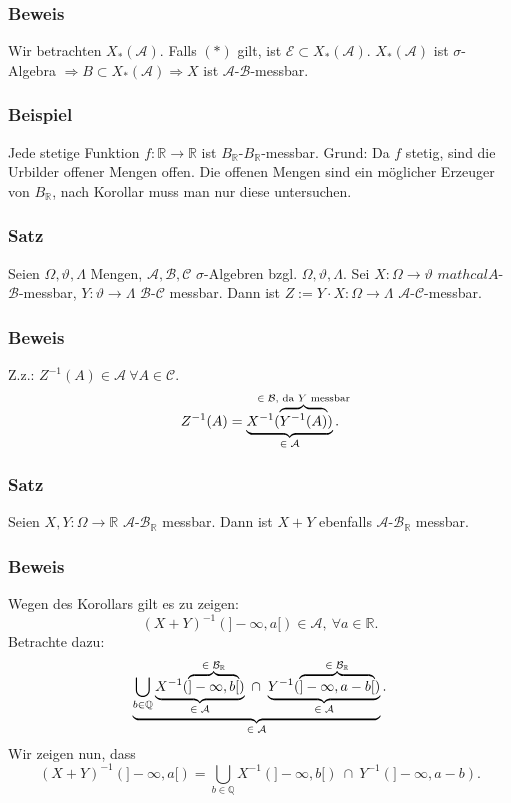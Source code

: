 \subsubsection{Beweis}
Wir betrachten $X_*(\mathcal{A})$. Falls $(*)$ gilt, ist $\mathcal{E}\subset X_*(\mathcal{A})$. $X_*(\mathcal{A})$ ist $\sigma$-Algebra $\Rightarrow B\subset X_*(\mathcal{A})\Rightarrow X$ ist $\mathcal{A}$-$\mathcal{B}$-messbar.
\subsubsection{Beispiel}
Jede stetige Funktion $f\colon\mathbb{R}\to\mathbb{R}$ ist $B_\mathbb{R}$-$B_\mathbb{R}$-messbar. Grund: Da $f$ stetig, sind die Urbilder offener Mengen offen. Die offenen Mengen sind ein m\"oglicher Erzeuger von $B_\mathbb{R}$, nach Korollar muss man nur diese untersuchen.
\subsubsection{Satz}
Seien $\Omega,\vartheta,\Lambda$ Mengen, $\mathcal{A},\mathcal{B},\mathcal{C}$ $\sigma$-Algebren bzgl. $\Omega,\vartheta,\Lambda$. Sei $X\colon\Omega\to\vartheta$ $mathcal{A}$-$\mathcal{B}$-messbar, $Y\colon\vartheta\to\Lambda$ $\mathcal{B}$-$\mathcal{C}$ messbar. Dann ist $Z:=Y\cdot X\colon\Omega\to\Lambda$ $\mathcal{A}$-$\mathcal{C}$-messbar.
\subsubsection{Beweis}
Z.z.: $Z^{-1}(A)\in\mathcal{A}\ \forall A\in\mathcal{C}$.
\[Z^{-1}(A)=\ubr{X^{-1}(\obr{Y^{-1}(A)}{$\in\mathcal{B}$, da $Y$ messbar})}{$\in\mathcal{A}$}.\]
\subsubsection{Satz}
Seien $X,Y\colon\Omega\to\mathbb{R}$ $\mathcal{A}$-$\mathcal{B}_\mathbb{R}$ messbar. Dann ist $X+Y$ ebenfalls $\mathcal{A}$-$\mathcal{B}_\mathbb{R}$ messbar.
\subsubsection{Beweis}
Wegen des Korollars gilt es zu zeigen:
\[(X+Y)^{-1}(]-\infty,a[)\in\mathcal{A},\ \forall a\in\mathbb{R}.\]
Betrachte dazu:
\[\ubr{\bigcup_{b\in\mathbb{Q}}\ubr{X^{-1}(\obr{]-\infty,b[}{$\in\mathcal{B}_\mathbb{R}$})}{$\in\mathcal{A}$}\ \cap\ \ubr{Y^{-1}(\obr{]-\infty,a-b[}{$\in\mathcal{B}_\mathbb{R}$})}{$\in\mathcal{A}$}}{$\in\mathcal{A}$}.\]
Wir zeigen nun, dass
\[(X+Y)^{-1}(]-\infty,a[)=\bigcup_{b\in\mathbb{Q}}X^{-1}(]-\infty,b[)\ \cap\ Y^{-1}(]-\infty,a-b).\]
\bul{
\item ``$\subset$'': Sei $\omega\in(X+Y)^{-1}(]-\infty,a[)\Leftrightarrow(X+Y)(\omega)<a$. Sei $b\in\mathbb{Q}$ mit $b\in]X(\omega),X(\omega)+\mathcal{\varepsilon}{2}[$. $\Rightarrow X(\omega)<b$ und $Y(\omega)+b<X(\omega)+Y(\omega)+\frac{\varepsilon}{2}<a\Rightarrow Y(\omega)<a-b$.
\item ``$\supset$'': Sei $\omega\in\ldots\Rightarrow\exists b$, sodass $X(\omega)<b$ und $Y(\omega)<a-b\Rightarrow(X+Y)(\omega)<a$.
}
